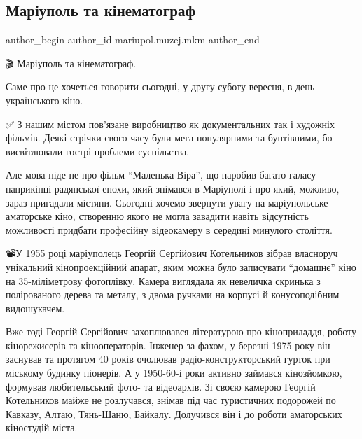  
 
 
 
 

\subsection{Маріуполь та кінематограф}
\label{sec:09_09_2023.fb.mariupol.muzej.mkm.1.mariupol_ta_kinematograf}

\ifcmt
 author_begin
   author_id mariupol.muzej.mkm
 author_end
\fi

🎬 Маріуполь та кінематограф. 

Саме про це хочеться говорити сьогодні, у другу суботу вересня, в день
українського кіно.🎉

✅️ З нашим містом пов'язане виробництво як документальних так і художніх
фільмів. Деякі стрічки свого часу були мега популярними та бунтівними, бо
висвітлювали гострі проблеми суспільства.

Але мова піде не про фільм \enquote{Маленька Віра}, що наробив багато галасу
наприкінці радянської епохи, який знімався в Маріуполі і про який, можливо,
зараз пригадали містяни. Сьогодні хочемо звернути увагу на маріупольське
аматорське кіно, створенню якого не могла завадити навіть відсутність
можливості придбати професійну відеокамеру в середині минулого століття.

📽У 1955 році маріуполець Георгій Сергійович Котельников зібрав власноруч
унікальний кінопроекційний апарат, яким можна було записувати \enquote{домашнє} кіно на
35-міліметрову фотоплівку. Камера виглядала як невеличка скринька з
полірованого дерева та металу, з двома ручками на корпусі й конусоподібним
видошукачем.

Вже тоді Георгій Сергійович захоплювався літературою про кіноприладдя, роботу
кінорежисерів та кінооператорів. Інженер за фахом, у березні 1975 року він
заснував та протягом 40 років очолював радіо-конструкторський гурток при
міському будинку піонерів. А у 1950-60-і роки активно займався кінозйомкою,
формував любительський фото- та відеоархів. Зі своєю камерою Георгій
Котельников майже не розлучався, знімав під час туристичних подорожей по
Кавказу, Алтаю, Тянь-Шаню, Байкалу. Долучився він і до роботи аматорських
кіностудій міста.

